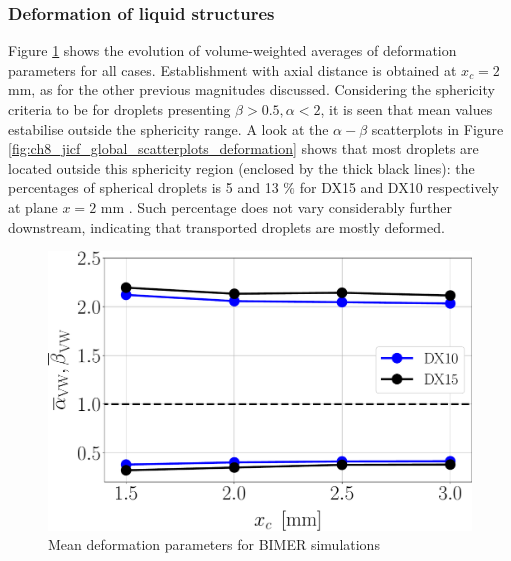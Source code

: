 \clearpage

\subsubsection*{Deformation of liquid structures}
\label{subsec:ch8_def_liquid_structures}

Figure \ref{fig:ch8_jicf_liquid_mean_deformation_with_x_condensed} shows the evolution of volume-weighted averages of deformation parameters for all cases. Establishment with axial distance is obtained at $x_c = 2$ mm, as for the other previous magnitudes discussed. Considering the sphericity criteria to be for droplets presenting $\beta > 0.5, \alpha < 2$, it is seen that mean values estabilise outside the sphericity range. A look at the $\alpha-\beta$ scatterplots in Figure \ref{fig:ch8_jicf_global_scatterplots_deformation} shows that most droplets are located outside this sphericity region (enclosed by the thick black lines): the percentages of spherical droplets is 5 and 13 $\%$ for DX15 and DX10 respectively at plane $x = 2$ mm . Such percentage does not vary considerably further downstream, indicating that transported droplets are mostly deformed. 


\begin{figure}[ht]
\centering
   \includegraphics[scale=0.25]{./part3_applications/figures_ch8_resolved/SPRAY_characterization/deformation/deformation_both_alpha_beta_mean}
   \vspace*{-0.1in}
   \caption{Mean deformation parameters for BIMER simulations}
\label{fig:ch8_jicf_liquid_mean_deformation_with_x_condensed}
\end{figure}


